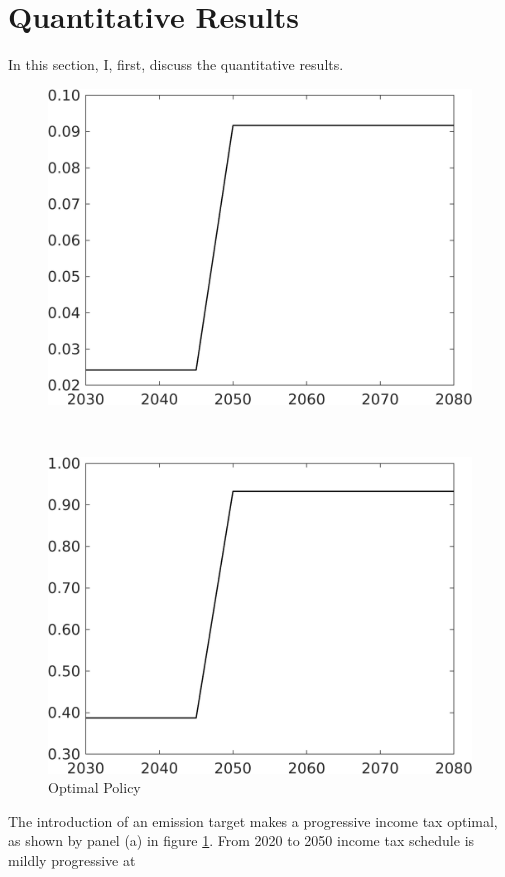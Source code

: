 \section{Quantitative Results}

In this section, I, first, discuss the quantitative results.

\begin{figure}[h!!]
	\centering
	\caption{Optimal Policy }\label{fig:optPol}
	\begin{minipage}[]{0.4\textwidth}
		\includegraphics[width=1\textwidth]{../../codding_model/own_basedOnFried/optimalPol_elastS_DisuSci/figures/all_0505/Single_OPT_T_NoTaus_taul_spillover1_noskill0.png}
	\end{minipage}
\begin{minipage}[]{0.1\textwidth}
\
\end{minipage}
	\begin{minipage}[]{0.4\textwidth}
		\includegraphics[width=1\textwidth]{../../codding_model/own_basedOnFried/optimalPol_elastS_DisuSci/figures/all_0505/Single_OPT_T_NoTaus_tauf_spillover1_noskill0.png}
	\end{minipage}
\end{figure} 

The introduction of an emission target makes a progressive income tax optimal, as shown by panel (a) in figure \ref{fig:optPol}. From 2020 to 2050 income tax schedule is mildly progressive at 